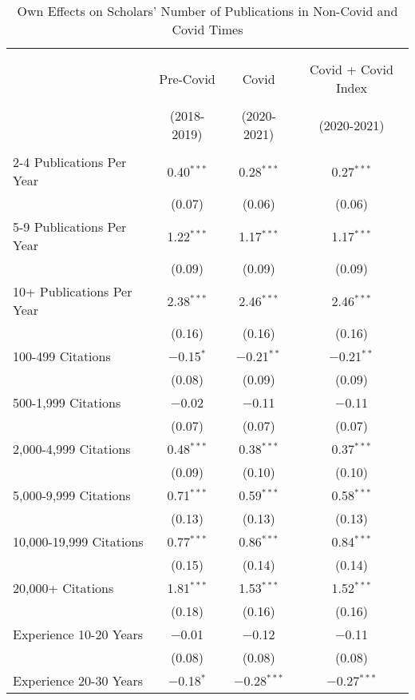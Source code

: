 \begin{table}[!htbp] \centering 
  \caption{Own Effects on Scholars' Number of Publications in Non-Covid and Covid Times} 
\begin{tabular}{lccc} 
\\[-1.8ex]\hline \hline \\[-1.8ex] 
\\[-1.8ex] & \multicolumn{1}{c}{Pre-Covid} & \multicolumn{1}{c}{Covid} & \multicolumn{1}{c}{Covid + Covid Index} \\ 
\\[-1.8ex] & (2018-2019) & (2020-2021) & (2020-2021) \\ 
\hline \\[-1.8ex]
  2-4 Publications Per Year & 0.40$^{***}$ & 0.28$^{***}$ & 0.27$^{***}$ \\ 
  & (0.07) & (0.06) & (0.06) \\
  5-9 Publications Per Year & 1.22$^{***}$ & 1.17$^{***}$ & 1.17$^{***}$ \\ 
  & (0.09) & (0.09) & (0.09) \\
  10+ Publications Per Year & 2.38$^{***}$ & 2.46$^{***}$ & 2.46$^{***}$ \\ 
  & (0.16) & (0.16) & (0.16) \\
  100-499 Citations & $-$0.15$^{*}$ & $-$0.21$^{**}$ & $-$0.21$^{**}$ \\ 
  & (0.08) & (0.09) & (0.09) \\
  500-1,999 Citations & $-$0.02 & $-$0.11 & $-$0.11 \\ 
  & (0.07) & (0.07) & (0.07) \\
  2,000-4,999 Citations & 0.48$^{***}$ & 0.38$^{***}$ & 0.37$^{***}$ \\ 
  & (0.09) & (0.10) & (0.10) \\
  5,000-9,999 Citations & 0.71$^{***}$ & 0.59$^{***}$ & 0.58$^{***}$ \\ 
  & (0.13) & (0.13) & (0.13) \\
  10,000-19,999 Citations & 0.77$^{***}$ & 0.86$^{***}$ & 0.84$^{***}$ \\ 
  & (0.15) & (0.14) & (0.14) \\
  20,000+ Citations & 1.81$^{***}$ & 1.53$^{***}$ & 1.52$^{***}$ \\ 
  & (0.18) & (0.16) & (0.16) \\
  Experience 10-20 Years & $-$0.01 & $-$0.12 & $-$0.11 \\ 
  & (0.08) & (0.08) & (0.08) \\
  Experience 20-30 Years & $-$0.18$^{*}$ & $-$0.28$^{***}$ & $-$0.27$^{***}$ \\ 

\end{tabular}
\end{table}
